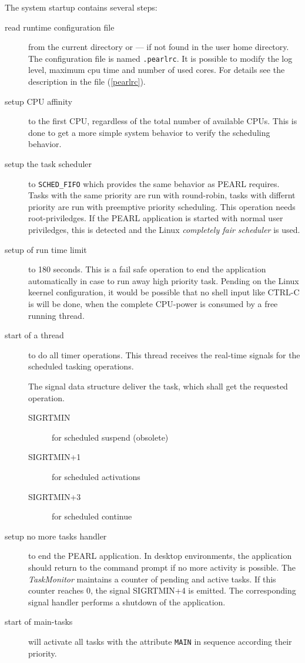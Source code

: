 The system startup contains several steps:
\begin{description}
\item[read runtime configuration file] from the current directory or ---
   if not found in the user home directory.
   The configuration file is named \texttt{.pearlrc}.
   It is possible to modify the log level, maximum cpu time and number of 
   used cores. 
   For details see the description in the file (\ref{pearlrc}).
\item[setup CPU affinity] to the first CPU, regardless of the
   total number of available CPUs. This is done to get a more simple
   system behavior to verify the scheduling behavior.
\item[setup the task scheduler] to \verb|SCHED_FIFO| which provides
   the same behavior as PEARL requires. Tasks with the same priority
   are run with round-robin, tasks with differnt priority are run with
   preemptive priority scheduling.
   This operation needs root-priviledges. If the PEARL application is 
   started with normal user priviledges, this is detected and the 
   Linux {\em completely fair scheduler} is used.
\item[setup of run time limit] to 180 seconds. This is a fail safe
   operation to end the application automatically in case to run away
   high priority task. Pending on the Linux keernel configuration,
   it would be possible that no shell input like CTRL-C is will
   be done, when the complete CPU-power is consumed by a free running thread.
\item[start of a thread] to do all timer operations. This thread 
   receives the real-time signals for the scheduled tasking operations.

   The signal data
   structure deliver the task, which shall get the requested operation.
   \begin{description}
    \item[SIGRTMIN] for scheduled suspend (obsolete)
    \item[SIGRTMIN+1] for scheduled activations
    \item[SIGRTMIN+3] for scheduled continue
    \end{description}
\item[setup no more tasks handler] to end the PEARL application.
   In desktop environments, the application should return to the 
   command prompt if no more activity is possible.
   The {\em TaskMonitor} maintains a counter of pending and active 
   tasks. If this counter reaches $0$, the signal SIGRTMIN+4 is emitted.
   The corresponding signal handler performs a shutdown of the application.
\item[start of main-tasks] will activate all tasks with the attribute
     \verb|MAIN| in sequence according their priority.
\end{description}

